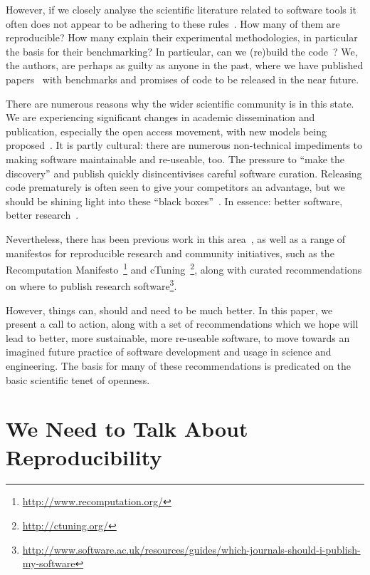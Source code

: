 \documentclass[a4paper,11pt]{article}
\begin{document}
However, if we closely analyse the scientific literature related to
software tools it often does not appear to be adhering to these
rules~\cite{nature:2011}. How many of them are reproducible? How many
explain their experimental methodologies, in particular the basis for
their benchmarking? In particular, can we (re)build the
code~\cite{collberg-et-al:2014}? We, the authors, are perhaps as
guilty as anyone in the past, where we have published
papers~\cite{crick-et-al:2009a,Berdine2011SLAyer} with benchmarks and
promises of code to be released in the near future.

There are numerous reasons why the wider scientific community is in
this state. We are experiencing significant changes in academic
dissemination and publication, especially the open access movement,
with new models being
proposed~\cite{stodden-et-al:2013,fursin+dubach:2014}. It is partly
cultural: there are numerous non-technical impediments to making
software maintainable and re-useable, too. The pressure to ``make the
discovery'' and publish quickly disincentivises careful software
curation. Releasing code prematurely is often seen to give your
competitors an advantage, but we should be shining light into these
``black boxes''~\cite{morin-et-al:2012}. In essence: better software,
better research~\cite{goble:2014}.

Nevertheless, there has been previous work in this
area~\cite{sim-et-al:2003,chirigati-et-al:2013}, as well as a range of
manifestos for reproducible research and community initiatives, such
as the Recomputation
Manifesto~\cite{gent:2013}\footnote{\url{http://www.recomputation.org/}}
and
cTuning~\cite{fursin-et-al:2014}\footnote{\url{http://ctuning.org/}},
along with curated recommendations on where to publish research
software\footnote{\url{http://www.software.ac.uk/resources/guides/which-journals-should-i-publish-my-software}}.

However, things can, should and need to be much better. In this paper,
we present a call to action, along with a set of recommendations which
we hope will lead to better, more sustainable, more re-useable
software, to move towards an imagined future practice of software
development and usage in science and engineering.  The basis for many
of these recommendations is predicated on the basic scientific tenet
of openness.

\section{We Need to Talk About Reproducibility}
\end{document}
